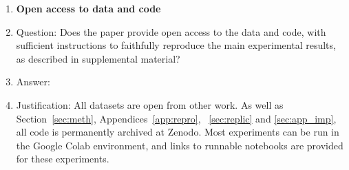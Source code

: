 \begin{enumerate}
\item {\bf Open access to data and code}
    \item[] Question: Does the paper provide open access to the data and code, with sufficient instructions to faithfully reproduce the main experimental results, as described in supplemental material?
    \item[] Answer: \answerYes{} %
    \item[] Justification: All datasets are open from other work. As well as Section~\ref{sec:meth}, Appendices~\ref{app:repro}, ~\ref{sec:replic} and \ref{sec:app_imp}, all code is permanently archived at Zenodo. Most experiments can be run in the Google Colab environment, and links to runnable notebooks are provided for these experiments.



\end{enumerate}
